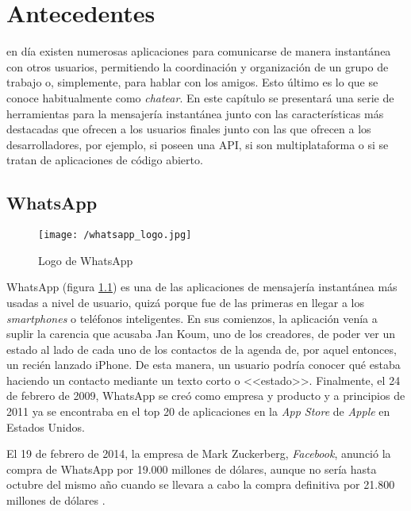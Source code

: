 \chapter{Antecedentes}
\label{chap:antecedentes}

 en día existen numerosas aplicaciones para comunicarse de manera instantánea con otros usuarios, permitiendo la coordinación y organización de un grupo de trabajo o, simplemente, para hablar con los amigos. Esto último es lo que se conoce habitualmente como \textit{chatear}. En este capítulo se presentará una serie de herramientas para la mensajería instantánea junto con las características más destacadas que ofrecen a los usuarios finales junto con las que ofrecen a los desarrolladores, por ejemplo, si poseen una \acf{API}, si son multiplataforma o si se tratan de aplicaciones de código abierto.

\section{WhatsApp}
\label{sec:whatsapp}

\begin{figure}
	\begin{center}
		\texttt{[image: /whatsapp\_logo.jpg]}
		\caption{Logo de WhatsApp}
		\label{fig:whatsapp}
	\end{center}
\end{figure}

WhatsApp (figura \ref{fig:whatsapp}) es una de las aplicaciones de mensajería instantánea más usadas a nivel de usuario, quizá porque fue de las primeras en llegar a los \textit{smartphones} o teléfonos inteligentes. En sus comienzos, la aplicación venía a suplir la carencia que acusaba Jan Koum, uno de los creadores, de poder ver un estado al lado de cada uno de los contactos de la agenda de, por aquel entonces, un recién lanzado iPhone. De esta manera, un usuario podría conocer qué estaba haciendo un contacto mediante un texto corto o <<estado>>. Finalmente, el 24 de febrero de 2009, WhatsApp se creó como empresa y producto y a principios de 2011 ya se encontraba en el top 20 de aplicaciones en la \textit{App Store} de \textit{Apple} en Estados Unidos.

\newpage

El 19 de febrero de 2014, la empresa de Mark Zuckerberg, \textit{Facebook}, anunció la compra de WhatsApp por 19.000 millones de dólares, aunque no sería hasta octubre del mismo año cuando se llevara a cabo la compra definitiva por 21.800 millones de dólares \cite{Novoa2014}.

